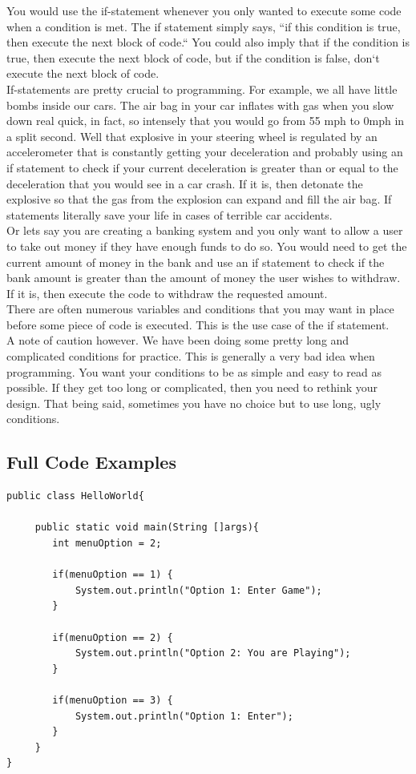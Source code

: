\documentclass[11]{article}
\begin{document}
You would use the if-statement whenever you only wanted to execute some code when a condition is met. The if statement simply says, ``if this condition is true, then execute the next block of code.`` You could also imply that if the condition is true, then execute the next block of code, but if the condition is false, don`t execute the next block of code.\\

If-statements are pretty crucial to programming. For example, we all have little bombs inside our cars. The air bag in your car inflates with gas when you slow down real quick, in fact, so intensely that you would go from 55 mph to 0mph in a split second. Well that explosive in your steering wheel is regulated by an accelerometer that is constantly getting your deceleration and probably using an if statement to check if your current deceleration is greater than or equal to the deceleration that you would see in a car crash. If it is, then detonate the explosive so that the gas from the explosion can expand and fill the air bag. If statements literally save your life in cases of terrible car accidents.\\

Or lets say you are creating a banking system and you only want to allow a user to take out money if they have enough funds to do so. You would need to get the current amount of money in the bank and use an if statement to check if the bank amount is greater than the amount of money the user wishes to withdraw. If it is, then execute the code to withdraw the requested amount.\\

There are often numerous variables and conditions that you may want in place before some piece of code is executed. This is the use case of the if statement.\\

A note of caution however. We have been doing some pretty long and complicated conditions for practice. This is generally a very bad idea when programming. You want your conditions to be as simple and easy to read as possible. If they get too long or complicated, then you need to rethink your design. That being said, sometimes you have no choice but to use long, ugly conditions.
\subsection{Full Code Examples}
\begin{lstlisting}
public class HelloWorld{

     public static void main(String []args){
        int menuOption = 2;
         
        if(menuOption == 1) {
            System.out.println("Option 1: Enter Game");
        }
        
        if(menuOption == 2) {
            System.out.println("Option 2: You are Playing");
        }
        
        if(menuOption == 3) {
            System.out.println("Option 1: Enter");
        }        
     }
}
\end{lstlisting}
\end{document}
